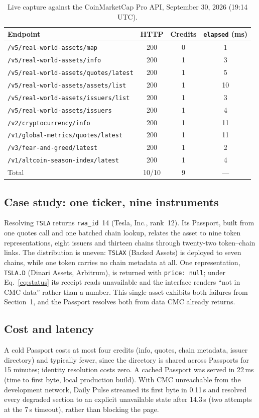 \documentclass[11pt]{article}
\newcommand{\code}[1]{\texttt{\small #1}}
\begin{document}
\begin{table}[t]
\centering\small
\begin{tabular}{@{}lccc@{}}
\toprule
Endpoint & HTTP & Credits & \code{elapsed} (ms)\\
\midrule
\code{/v5/real-world-assets/map} & 200 & 0 & 1\\
\code{/v5/real-world-assets/info} & 200 & 1 & 3\\
\code{/v5/real-world-assets/quotes/latest} & 200 & 1 & 5\\
\code{/v5/real-world-assets/assets/list} & 200 & 1 & 10\\
\code{/v5/real-world-assets/issuers/list} & 200 & 1 & 3\\
\code{/v5/real-world-assets/issuers} & 200 & 1 & 4\\
\code{/v2/cryptocurrency/info} & 200 & 1 & 11\\
\code{/v1/global-metrics/quotes/latest} & 200 & 1 & 11\\
\code{/v3/fear-and-greed/latest} & 200 & 1 & 2\\
\code{/v1/altcoin-season-index/latest} & 200 & 1 & 4\\
\midrule
Total & 10/10 & 9 & ---\\
\bottomrule
\end{tabular}
\caption{Live capture against the CoinMarketCap Pro API, September 30, 2026 (19:14 UTC).}
\label{tab:live}
\end{table}

\subsection{Case study: one ticker, nine instruments}
Resolving \code{TSLA} returns \code{rwa\_id}~14 (Tesla, Inc., rank~12). Its Passport, built from one quotes call and one batched chain lookup, relates the asset to nine token representations, eight issuers and thirteen chains through twenty-two token--chain links. The distribution is uneven: \code{TSLAX} (Backed Assets) is deployed to seven chains, while one token carries no chain metadata at all. One representation, \code{TSLA.D} (Dinari Assets, Arbitrum), is returned with \code{price: null}; under Eq.~\ref{eq:status} its receipt reads \textsf{unavailable} and the interface renders ``not in CMC data'' rather than a number. This single asset exhibits both failures from Section~1, and the Passport resolves both from data CMC already returns.

\subsection{Cost and latency}
A cold Passport costs at most four credits (info, quotes, chain metadata, issuer directory) and typically fewer, since the directory is shared across Passports for 15 minutes; identity resolution costs zero. A cached Passport was served in 22\,ms (time to first byte, local production build). With CMC unreachable from the development network, Daily Pulse streamed its first byte in 0.11\,s and resolved every degraded section to an explicit unavailable state after 14.3\,s (two attempts at the 7\,s timeout), rather than blocking the page.
\end{document}
